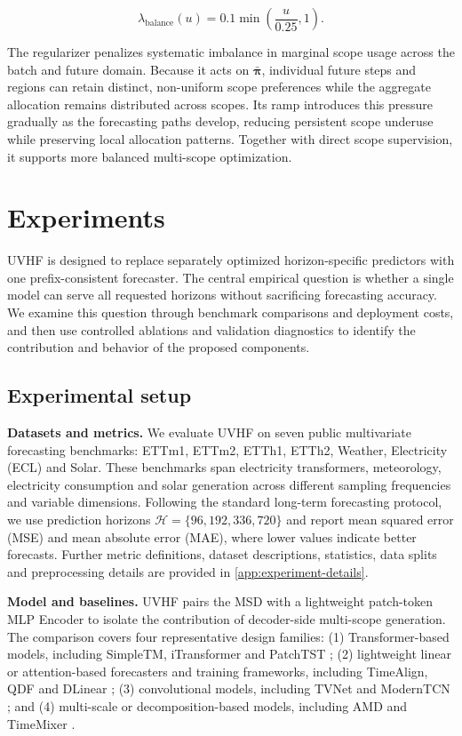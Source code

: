\documentclass[final,3p,times]{elsarticle}
\newif\ifshowrevisions
\newcommand{\rev}[1]{\ifshowrevisions\textcolor{revisionblue}{#1}\else#1\fi}
\begin{document}
\[
\lambda_{\mathrm{balance}}(u)
=
0.1
\min\!\left(
\frac{u}{0.25},1
\right).
\]


The regularizer penalizes systematic imbalance in marginal scope usage across the batch and future domain. Because it acts on $\bar{\boldsymbol\pi}$, individual future steps and regions can retain distinct, non-uniform scope preferences while the aggregate allocation remains distributed across scopes. Its ramp introduces this pressure gradually as the forecasting paths develop, reducing persistent scope underuse while preserving local allocation patterns. Together with direct scope supervision, it supports more balanced multi-scope optimization.

\section{Experiments}
\label{sec:experiments}


\rev{UVHF is designed to replace separately optimized horizon-specific predictors with one prefix-consistent forecaster.} The central empirical question is whether a single model can serve all requested horizons without sacrificing forecasting accuracy. We examine this question through benchmark comparisons and deployment costs, and then use controlled ablations and validation diagnostics to identify the contribution and behavior of the proposed components.

\subsection{Experimental setup}


\textbf{Datasets and metrics.} We evaluate \rev{UVHF} on seven public multivariate forecasting benchmarks: ETTm1, ETTm2, ETTh1, ETTh2, Weather, Electricity (ECL) and Solar. These benchmarks span electricity transformers, meteorology, electricity consumption and solar generation across different sampling frequencies and variable dimensions. Following the standard long-term forecasting protocol, we use prediction horizons $\mathcal H=\{96,192,336,720\}$ and report mean squared error (MSE) and mean absolute error (MAE), where lower values indicate better forecasts. Further metric definitions, dataset descriptions, statistics, data splits and preprocessing details are provided in \ref{app:experiment-details}.

\textbf{Model and baselines.} \rev{UVHF pairs the MSD with a lightweight patch-token MLP Encoder to isolate the contribution of decoder-side multi-scope generation.} The comparison covers four representative design families: (1) Transformer-based models, including SimpleTM, iTransformer and PatchTST \citep{chen2025simpletm,liu2024itransformer,nie2023patchtst}; (2) lightweight linear or attention-based forecasters and training frameworks, including TimeAlign, QDF and DLinear \citep{hu2026timealign,wang2026qdf,zeng2023dlinear}; (3) convolutional models, including TVNet and ModernTCN \citep{li2025tvnet,luo2024moderntcn}; and (4) multi-scale or decomposition-based models, including AMD and TimeMixer \citep{hu2025amd,wang2024timemixer}.
\end{document}
